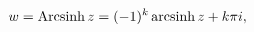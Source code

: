 \[w=\mathop{\mathrm{Arcsinh}\/}\nolimits z=(-1)^{k}\mathop{\mathrm{arcsinh}\/}%
\nolimits z+k\pi i,\]